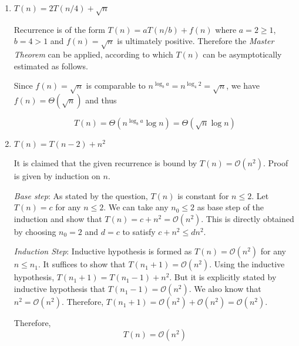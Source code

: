 \begin{enumerate}[label=(\alph*)]
\item $T(n) = 2T(n/4) + \sqrt{n}$

Recurrence is of the form $T(n) = aT(n/b)+f(n)$ where $a=2 \geq 1$, $b=4 > 1$ and $f(n) = \sqrt{n}$ is ultimately positive.
Therefore the \emph{Master Theorem} can be applied, according to which $T(n)$ can be asymptotically estimated as follows.

Since $f(n) = \sqrt{n}$ is comparable to $n^{\log_b a}=n^{\log_4 2}=\sqrt{n}$, we have $ f(n) = \Theta(\sqrt{n})$ and thus

\begin{equation}
T(n) = \Theta(n^{\log_b a}\log n) = \Theta(\sqrt{n} \log n)
\end{equation}

\item $T(n) = T(n-2) + n^2$

It is claimed that the given recurrence is bound by $T(n) = \mathcal{O}(n^2)$.
Proof is given by induction on $n$.

\emph{Base step}: As stated by the question, $T(n)$ is constant for $n \leq 2$.
Let $T(n) = c$ for any $n \leq 2$.
We can take any $n_0 \leq 2$ as base step of the induction and show that $T(n) = c + n^2 = \mathcal{O}(n^2)$.
This is directly obtained by choosing $n_0 = 2$ and $d = c$ to satisfy $c + n^2 \leq d n^2$.

\emph{Induction Step}: Inductive hypothesis is formed as $T(n) = \mathcal{O}(n^2)$ for any $n \leq n_1$.
It suffices to show that $T(n_1+1) = \mathcal{O}(n^2)$.
Using the inductive hypothesis, $T(n_1+1) = T(n_1-1) + n^2$.
But it is explicitly stated by inductive hypothesis that $T(n_1-1) = \mathcal{O}(n^2)$.
We also know that $n^2 = \mathcal{O}(n^2)$.
Therefore, $T(n_1+1) = \mathcal{O}(n^2) + \mathcal{O}(n^2) = \mathcal{O}(n^2)$.

Therefore,
\begin{equation}
T(n) = \mathcal{O}(n^2)
\end{equation}

\end{enumerate}
